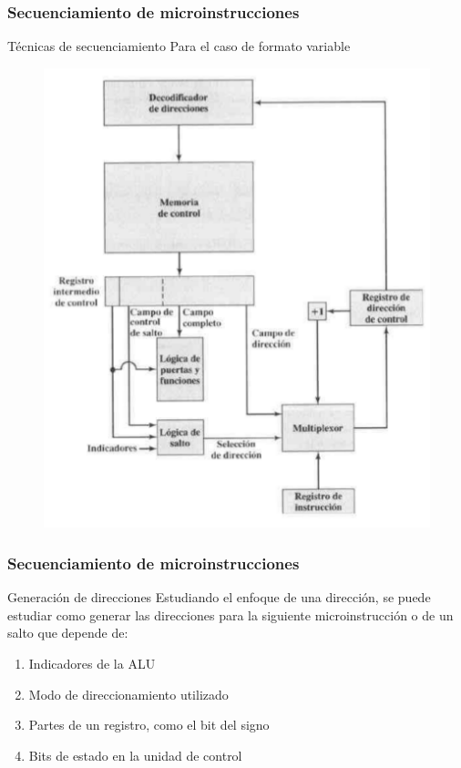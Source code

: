 \documentclass{beamer}
\begin{document}
\begin{frame}
	\frametitle{Secuenciamiento de microinstrucciones}
	\begin{block}{Técnicas de secuenciamiento}
	Para el caso de formato variable
	\end{block}	
	\begin{figure}[H]
		\centering
		\includegraphics[scale=0.3]{imagenes/variable.png} 
	\end{figure}
\end{frame}


\begin{frame}
	\frametitle{Secuenciamiento de microinstrucciones}
	\begin{block}{Generación de direcciones}
	Estudiando el enfoque de una dirección, se puede estudiar como generar las direcciones para la siguiente microinstrucción o de un salto que depende de:
	\begin{enumerate}
		\item Indicadores de la ALU
		\item Modo de direccionamiento utilizado
		\item Partes de un registro, como el bit del signo
		\item Bits de estado en la unidad de control
	\end{enumerate}
	\end{block}	
\end{frame}
\end{document}

